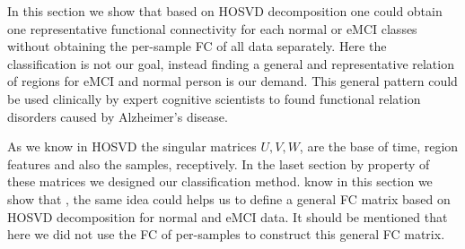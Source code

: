 \documentclass[journal]{IEEEtran}
\begin{document}
	
%	

	
	In this section we show that based on HOSVD decomposition one could  obtain  one representative functional connectivity for each normal or eMCI classes without obtaining the per-sample FC of all data separately. Here the classification is not our goal, instead  finding a general and representative
	relation of regions for eMCI and normal person is our demand. This general pattern could be used clinically by expert cognitive scientists to found  
	functional relation disorders caused by Alzheimer's disease.
	
	As we know in HOSVD  the singular matrices $U,V,W$, are the base of time, region features and also the samples, receptively. In the laset section by property of these matrices we designed our classification method.  know in this section we show that
	, the same idea could helps us to define a general FC matrix based on HOSVD decomposition for normal and
	eMCI data. It should be mentioned that here we did not use the FC of per-samples to construct this general FC matrix.
	
\end{document}
